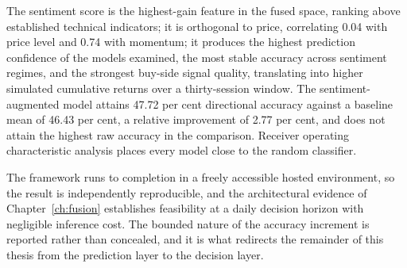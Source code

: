 The sentiment score is the highest-gain feature in the fused space, ranking above established
technical indicators; it is orthogonal to price, correlating 0.04 with price level and 0.74 with
momentum; it produces the highest prediction confidence of the models examined, the most stable
accuracy across sentiment regimes, and the strongest buy-side signal quality, translating into
higher simulated cumulative returns over a thirty-session window. The sentiment-augmented model
attains 47.72 per cent directional accuracy against a baseline mean of 46.43 per cent, a relative
improvement of 2.77 per cent, and does not attain the highest raw accuracy in the comparison.
Receiver operating characteristic analysis places every model close to the random classifier.

The framework runs to completion in a freely accessible hosted environment, so the result is
independently reproducible, and the architectural evidence of Chapter~\ref{ch:fusion} establishes
feasibility at a daily decision horizon with negligible inference cost. The bounded nature of the
accuracy increment is reported rather than concealed, and it is what redirects the remainder of
this thesis from the prediction layer to the decision layer.
